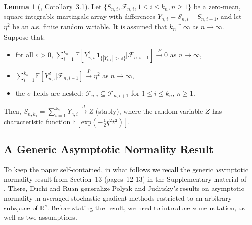 \documentclass[11pt,a4paper]{article}
\theoremstyle{definition}
\newtheorem{lemma}[theorem]{Lemma}
\begin{document}
\begin{lemma}[\citet{hall2014martingale}, Corollary~3.1]
\label{lemma:clt:martingale}
Let $\{S_{n,i}, \mathcal F_{n,i}, 1\leq i \leq k_n, n \geq 1\}$ be a zero-mean, square-integrable martingale array with differences $Y_{n,i} = S_{n,i} - S_{n,i-1}$, and let $\eta^2$ be an a.s. finite random variable. It is assumed that $k_n \uparrow \infty$ as $n \to \infty$. Suppose that:
\begin{itemize}
    \item[(i)] for all $\varepsilon >0$, $\sum_{i=1}^{k_n} \mathbb E \left[ Y_{n,i}^2 \, \mathbf{1}_{\{|Y_{n,i}| \, > \, \varepsilon\}} | \mathcal F_{n,i-1}\right] \overset{P}{\to} 0$ as $n \to \infty$,

    \item[(ii)] $\sum_{i=1}^{k_n} \mathbb E \left[ Y_{n,i}^2 | \mathcal F_{n,i-1}\right] \overset{P}{\to} \eta^2$ as $n \to \infty$,

    \item[(ii)] the $\sigma$-fields are nested: $\mathcal F_{n,i} \subseteq \mathcal F_{n,i+1}$ for $1 \leq i \leq k_n$, $n \geq 1$.
\end{itemize}
Then, $S_{n,k_n} = \sum_{i=1}^{k_n} Y_{n,i} \overset{d}{\to} Z$ (stably), where the random variable $Z$ has characteristic function $\mathbb E \left[ \text{exp}(-\frac{1}{2}\eta^2 t^2) \right]$.
\end{lemma}

\subsection{A Generic Asymptotic Normality Result}
\label{subsec:generic:asym:nor}

To keep the paper self-contained, in what follows we recall the generic asymptotic normality result from Section~13 (pages~12-13) in the Supplementary material of \cite{duchi2021asymptotic}. There, Duchi and Ruan generalize Polyak and Juditsky’s results \cite{polyak1992acceleration} on asymptotic normality in averaged stochastic gradient methods restricted to an arbitrary subspace of $\mathbb R^s$. Before stating the result, we need to introduce some notation, as well as two assumptions.
\end{document}
